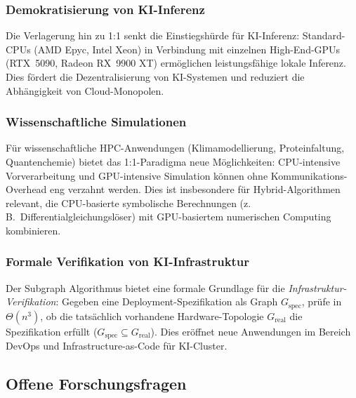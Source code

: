 ﻿\documentclass[a4paper,12pt]{article}
\theoremstyle{definition}
\begin{document}
\subsubsection{Demokratisierung von KI-Inferenz}

Die Verlagerung hin zu 1:1 senkt die Einstiegsh\"urde f\"ur KI-Inferenz:
Standard-CPUs (AMD Epyc, Intel Xeon) in Verbindung mit einzelnen High-End-GPUs
(RTX~5090, Radeon RX~9900 XT) erm\"oglichen leistungsf\"ahige lokale Inferenz.
Dies f\"ordert die Dezentralisierung von KI-Systemen und reduziert die
Abh\"angigkeit von Cloud-Monopolen.

\subsubsection{Wissenschaftliche Simulationen}

F\"ur wissenschaftliche HPC-Anwendungen (Klimamodellierung, Proteinfaltung,
Quantenchemie) bietet das 1:1-Paradigma neue M\"oglichkeiten: CPU-intensive
Vorverarbeitung und GPU-intensive Simulation k\"onnen ohne Kommunikations-Overhead
eng verzahnt werden. Dies ist insbesondere f\"ur Hybrid-Algorithmen relevant,
die CPU-basierte symbolische Berechnungen (z.\,B.\ Differentialgleichungsl\"oser)
mit GPU-basiertem numerischen Computing kombinieren.

\subsubsection{Formale Verifikation von KI-Infrastruktur}

Der Subgraph Algorithmus bietet eine formale Grundlage f\"ur die
\emph{Infrastruktur-Verifikation}: Gegeben eine Deployment-Spezifikation
als Graph $G_\text{spec}$, pr\"ufe in $\Theta(n^3)$, ob die tats\"achlich
vorhandene Hardware-Topologie $G_\text{real}$ die Spezifikation erf\"ullt
($G_\text{spec} \subseteq G_\text{real}$). Dies er\"offnet neue Anwendungen
im Bereich DevOps und Infrastructure-as-Code f\"ur KI-Cluster.

\subsection{Offene Forschungsfragen}
\end{document}
